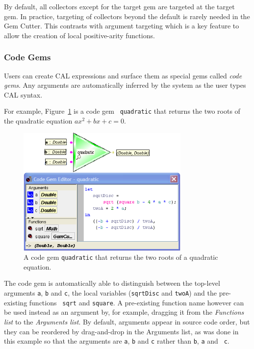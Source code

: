 \documentclass[preprint]{sigplanconf}
\begin{document}
By default, all collectors except for the
target gem are targeted at the target gem. In practice,
targeting of collectors beyond the default is rarely needed in
the Gem Cutter. This contrasts with argument targeting which is a key
feature to allow the creation of local positive-arity functions.

\subsubsection{Code Gems}
\label{sec:codeGems}

Users can create CAL expressions and surface them as special gems
called {\it code gems}. Any arguments are automatically inferred by
the system as the user types CAL syntax.

For example, Figure~\ref{fig:quadraticFormulaCodeGem} is a code gem {\tt
quadratic} that returns the two roots of the quadratic equation
$ax^2 + bx + c = 0$.

\begin{figure}[htb]
  \centering
  \includegraphics[width=20pc]{quadraticFormulaCodeGem.png}
  \caption{A code gem {\tt quadratic} that returns the two roots of a quadratic equation.}
  \label{fig:quadraticFormulaCodeGem}
\end{figure}

The code gem is automatically able to distinguish between the
top-level arguments {\tt a}, {\tt b} and {\tt c}, the local variables
({\tt sqrtDisc} and {\tt twoA}) and the pre-existing functions {\tt
sqrt} and {\tt square}. A pre-existing function name however can be used
instead as an argument by, for example, dragging it from the {\it Functions
list} to the {\it Arguments list}. By default, arguments appear in source
code order, but they can be reordered by drag-and-drop in the
Arguments list, as was done in this example so that the arguments are
{\tt a}, {\tt b} and {\tt c} rather than {\tt b}, {\tt a} and {\tt
c}.
\end{document}
